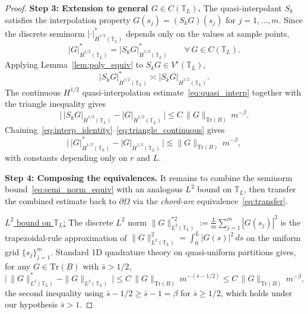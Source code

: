\documentclass[11pt]{article}
\begin{document}
\begin{proof}
\medskip\noindent
\textbf{Step 3: Extension to general $G \in C(\mathbb{T}_L)$.}
The quasi-interpolant $S_k$ satisfies the interpolation property
$G(s_j) = (S_k G)(s_j)$ for $j = 1, \ldots, m$. Since the discrete
seminorm $|\cdot|^*_{\dot{H}^{1/2}(\mathbb{T}_L)}$ depends only on
the values at sample points,
\begin{equation}\label{eq:interp_identity}
  |G|^*_{\dot{H}^{1/2}(\mathbb{T}_L)}
  = |S_k G|^*_{\dot{H}^{1/2}(\mathbb{T}_L)}
  \qquad \forall\, G \in C(\mathbb{T}_L).
\end{equation}
Applying Lemma~\ref{lem:poly_equiv} to
$S_k G \in V^r(\mathbb{T}_L)$,
\begin{equation}\label{eq:poly_equiv_applied}
  |S_k G|^*_{\dot{H}^{1/2}(\mathbb{T}_L)}
  \asymp |S_k G|_{\dot{H}^{1/2}(\mathbb{T}_L)}.
\end{equation}
The continuous $H^{1/2}$ quasi-interpolation
estimate~\eqref{eq:quasi_interp} together with the triangle
inequality gives
\begin{equation}\label{eq:triangle_continuous}
  \bigl|\, |S_k G|_{\dot{H}^{1/2}(\mathbb{T}_L)}
        - |G|_{\dot{H}^{1/2}(\mathbb{T}_L)} \,\bigr|
  \le C\, \|G\|_{\mathrm{Tr}(B)}\, m^{-\beta}.
\end{equation}
Chaining~\eqref{eq:interp_identity}--\eqref{eq:triangle_continuous}
gives
\begin{equation}\label{eq:semi_norm_equiv}
  \bigl|\, |G|^*_{\dot{H}^{1/2}(\mathbb{T}_L)}
        - |G|_{\dot{H}^{1/2}(\mathbb{T}_L)} \,\bigr|
  \lesssim \|G\|_{\mathrm{Tr}(B)}\, m^{-\beta},
\end{equation}
with constants depending only on $r$ and $L$.


\medskip\noindent
\textbf{Step 4: Composing the equivalences.}
It remains to combine the seminorm bound~\eqref{eq:semi_norm_equiv}
with an analogous $L^2$ bound on $\mathbb{T}_L$, then transfer the
combined estimate back to $\partial\Omega$ via the \textit{chord-arc}
equivalence~\eqref{eq:transfer}.

\smallskip\noindent
\underline{$L^2$ bound on $\mathbb{T}_L$:} The discrete $L^2$ norm
$\|G\|^{*2}_{L^2(\mathbb{T}_L)} := \frac{L}{m}\sum_{j=1}^{m}|G(s_j)|^2$
is the trapezoidal-rule approximation of
$\|G\|^2_{L^2(\mathbb{T}_L)} = \int_0^L |G(s)|^2\,ds$ on the uniform
grid $\{s_j\}_{j=1}^m$. Standard 1D quadrature theory on
quasi-uniform partitions
\cite[Theorem~4.4.4]{BrennerScott2008} gives, for any
$G \in \mathrm{Tr}(B)$ with $\bar{s} > 1/2$,
\begin{equation}\label{eq:L2_disc}
  \bigl|\, \|G\|^*_{L^2(\mathbb{T}_L)} - \|G\|_{L^2(\mathbb{T}_L)} \,\bigr|
  \le C\,\|G\|_{\mathrm{Tr}(B)}\,m^{-(\bar{s} - 1/2)}
  \le C\,\|G\|_{\mathrm{Tr}(B)}\,m^{-\beta},
\end{equation}
the second inequality using $\bar{s} - 1/2 \ge \bar{s} - 1 = \beta$
for $\bar{s} \ge 1/2$, which holds under our hypothesis $\bar{s} > 1$.


\end{proof}
\end{document}
